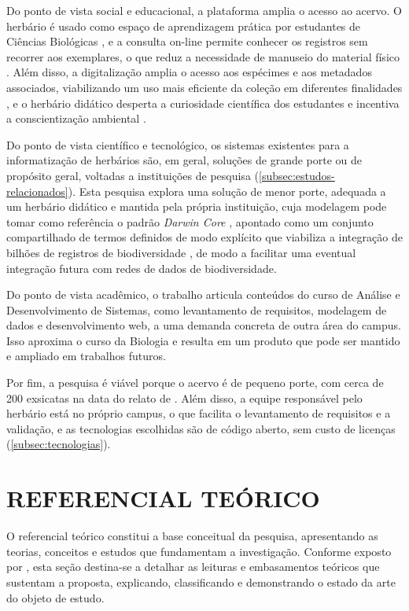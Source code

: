 \documentclass[
    12pt,        %
    openany,     %
    oneside,     %
    a4paper,     %
    english,     %
    french,      %
    spanish,     %
    brazil,      %
    article      %
]{abntex2}
\begin{document}
Do ponto de vista social e educacional, a plataforma amplia o acesso ao acervo. O herbário é usado como espaço de aprendizagem prática por estudantes de Ciências Biológicas \cite{lopes2023herbario}, e a consulta on-line permite conhecer os registros sem recorrer aos exemplares, o que reduz a necessidade de manuseio do material físico \cite{thompson2023digitisation}. Além disso, a digitalização amplia o acesso aos espécimes e aos metadados associados, viabilizando um uso mais eficiente da coleção em diferentes finalidades \cite{paton2026digitisation}, e o herbário didático desperta a curiosidade científica dos estudantes e incentiva a conscientização ambiental \cite{lopes2022herbarios}.

Do ponto de vista científico e tecnológico, os sistemas existentes para a informatização de herbários são, em geral, soluções de grande porte ou de propósito geral, voltadas a instituições de pesquisa (\autoref{subsec:estudos-relacionados}). Esta pesquisa explora uma solução de menor porte, adequada a um herbário didático e mantida pela própria instituição, cuja modelagem pode tomar como referência o padrão \textit{Darwin Core} \cite{tdwg2009darwincore}, apontado como um conjunto compartilhado de termos definidos de modo explícito que viabiliza a integração de bilhões de registros de biodiversidade \cite{heberling2022bigdata}, de modo a facilitar uma eventual integração futura com redes de dados de biodiversidade.

Do ponto de vista acadêmico, o trabalho articula conteúdos do curso de Análise e Desenvolvimento de Sistemas, como levantamento de requisitos, modelagem de dados e desenvolvimento web, a uma demanda concreta de outra área do campus. Isso aproxima o curso da Biologia e resulta em um produto que pode ser mantido e ampliado em trabalhos futuros.

Por fim, a pesquisa é viável porque o acervo é de pequeno porte, com cerca de 200 exsicatas na data do relato de . Além disso, a equipe responsável pelo herbário está no próprio campus, o que facilita o levantamento de requisitos e a validação, e as tecnologias escolhidas são de código aberto, sem custo de licenças (\autoref{subsec:tecnologias}).

\section{REFERENCIAL TEÓRICO}
\label{sec:referencial}

O referencial teórico constitui a base conceitual da pesquisa, apresentando as teorias, conceitos e estudos que fundamentam a investigação. Conforme exposto por , esta seção destina-se a detalhar as leituras e embasamentos teóricos que sustentam a proposta, explicando, classificando e demonstrando o estado da arte do objeto de estudo.
\end{document}
